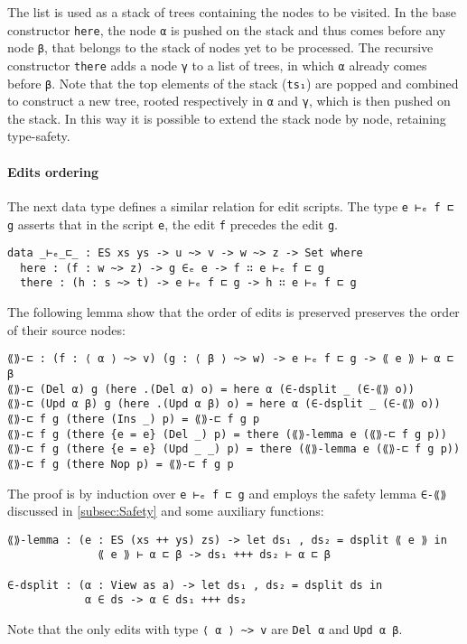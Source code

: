 \documentclass[../Thesis.tex]{subfiles}
\begin{document}
	The list is used as a stack of trees containing the nodes to be visited.
	In the base constructor \texttt{here}, the node \texttt{α} is pushed on the 
	stack and thus comes before any node \texttt{β}, that belongs to the
	stack of nodes yet to be processed.
	The recursive constructor \texttt{there} adds a node \texttt{γ} to a list of 
	trees, in which \texttt{α} already comes before \texttt{β}.
	Note that the top elements of the stack (\texttt{ts₁}) are popped 
	and combined to construct a new tree, rooted respectively 
	in \texttt{α} and \texttt{γ}, which is then pushed on the stack. 
	In this way it is possible to extend the stack node by node, 
	retaining type-safety. 
	
	\paragraph{Edits ordering}
	The next data type defines a similar relation for edit scripts.
	The type \texttt{e ⊢ₑ f ⊏ g} asserts that in the script \texttt{e}, the edit
	\texttt{f} precedes the edit \texttt{g}.
	
\begin{verbatim}
data _⊢ₑ_⊏_ : ES xs ys -> u ~> v -> w ~> z -> Set where
  here : (f : w ~> z) -> g ∈ₑ e -> f ∷ e ⊢ₑ f ⊏ g 
  there : (h : s ~> t) -> e ⊢ₑ f ⊏ g -> h ∷ e ⊢ₑ f ⊏ g 
\end{verbatim}

	The following lemma show that the order of edits is preserved
	preserves the order of their source nodes:	
\begin{verbatim}
⟪⟫-⊏ : (f : ⟨ α ⟩ ~> v) (g : ⟨ β ⟩ ~> w) -> e ⊢ₑ f ⊏ g -> ⟪ e ⟫ ⊢ α ⊏ β
⟪⟫-⊏ (Del α) g (here .(Del α) o) = here α (∈-dsplit _ (∈-⟪⟫ o))
⟪⟫-⊏ (Upd α β) g (here .(Upd α β) o) = here α (∈-dsplit _ (∈-⟪⟫ o))
⟪⟫-⊏ f g (there (Ins _) p) = ⟪⟫-⊏ f g p
⟪⟫-⊏ f g (there {e = e} (Del _) p) = there (⟪⟫-lemma e (⟪⟫-⊏ f g p))
⟪⟫-⊏ f g (there {e = e} (Upd _ _) p) = there (⟪⟫-lemma e (⟪⟫-⊏ f g p))
⟪⟫-⊏ f g (there Nop p) = ⟪⟫-⊏ f g p
\end{verbatim}

	The proof is by induction over \texttt{e ⊢ₑ f ⊏ g} and employs
	the safety lemma \texttt{∈-⟪⟫} discussed in \ref{subsec:Safety} and 
	some auxiliary functions:
\begin{verbatim}
⟪⟫-lemma : (e : ES (xs ++ ys) zs) -> let ds₁ , ds₂ = dsplit ⟪ e ⟫ in 
              ⟪ e ⟫ ⊢ α ⊏ β -> ds₁ +++ ds₂ ⊢ α ⊏ β

∈-dsplit : (α : View as a) -> let ds₁ , ds₂ = dsplit ds in 
            α ∈ ds -> α ∈ ds₁ +++ ds₂
\end{verbatim}
	Note that the only edits with type \texttt{⟨ α ⟩ \textasciitilde> v} are \texttt{Del α}
	and \texttt{Upd α β}.
	
\end{document}

